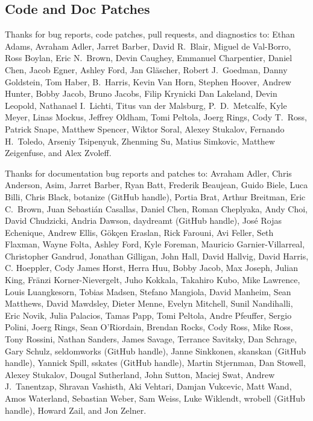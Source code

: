 \subsection*{Code  and Doc Patches}

Thanks for bug reports, code patches, pull requests, and diagnostics
to:
Ethan Adams,
Avraham Adler,
Jarret Barber, 
David R.~Blair,
Miguel de Val-Borro, 
Ross Boylan, 
Eric N.~Brown, 
Devin Caughey, 
Emmanuel Charpentier,
Daniel Chen,
Jacob Egner,
Ashley Ford,
Jan Gl\"ascher,
Robert J.\ Goedman,
Danny Goldstein,
Tom Haber,
B.~Harris,
Kevin Van Horn,
Stephen Hoover,
Andrew Hunter,
Bobby Jacob,
Bruno Jacobs,
Filip Krynicki
Dan Lakeland,
Devin Leopold,
Nathanael I.~Lichti,
Titus van der Malsburg,
P.~D.~Metcalfe,
Kyle Meyer,
Linas Mockus,
Jeffrey Oldham,
Tomi Peltola,
Joerg Rings,
Cody T.\ Ross,
Patrick Snape,
Matthew Spencer,
Wiktor Soral,
Alexey Stukalov,
Fernando H.~Toledo,
Arseniy Tsipenyuk,
Zhenming Su,
Matius Simkovic,
Matthew Zeigenfuse,
and
Alex Zvoleff.

Thanks for documentation bug reports and patches to:
Avraham Adler,
Chris Anderson,
Asim,
Jarret Barber,
Ryan Batt,
Frederik Beaujean,
Guido Biele,
Luca Billi,
Chris Black,
botanize (GitHub handle),
Portia Brat,
Arthur Breitman,
Eric C.~Brown,
Juan Sebasti\'an Casallas,
Daniel Chen,
Roman Cheplyaka,
Andy Choi, 
David Chudzicki,
Andria Dawson,
daydreamt (GitHub handle),
Jos\'{e} Rojas Echenique,
Andrew Ellis,
G\"{o}k\c{c}en Eraslan,
Rick Farouni,
Avi Feller,
Seth Flaxman,
Wayne Folta,
Ashley Ford,
Kyle Foreman,
Mauricio Garnier-Villarreal,
Christopher Gandrud,
Jonathan Gilligan,
John Hall,
David Hallvig,
David Harris,
C. Hoeppler,
Cody James Horst,
Herra Huu,
Bobby Jacob,
Max Joseph,
Julian King,
Fr\"anzi Korner-Nievergelt,
Juho Kokkala,
Takahiro Kubo,
Mike Lawrence,
Louis Luangkesorn,
Tobias Madsen,
Stefano Mangiola,
David Manheim,
Sean Matthews,
David Mawdsley,
Dieter Menne,
Evelyn Mitchell,
Sunil Nandihalli,
Eric Novik,
Julia Palacios,
Tamas Papp, 
Tomi Peltola,
Andre Pfeuffer,
Sergio Polini,
Joerg Rings,
Sean O'Riordain,
Brendan Rocks,
Cody Ross,
Mike Ross,
Tony Rossini,
Nathan Sanders,
James Savage,
Terrance Savitsky,
Dan Schrage,
Gary Schulz,
seldomworks (GitHub handle),
Janne Sinkkonen,
skanskan (GitHub handle),
Yannick Spill,
sskates (GitHub handle),
Martin Stjernman,
Dan Stowell,
Alexey Stukalov,
Dougal Sutherland,
John Sutton,
Maciej Swat,
Andrew J.~Tanentzap,
Shravan Vashisth,
Aki Vehtari,
Damjan Vukcevic,
Matt Wand,
Amos Waterland,
Sebastian Weber,
Sam Weiss,
Luke Wiklendt,
wrobell (GitHub handle),
Howard Zail, and
Jon Zelner.

